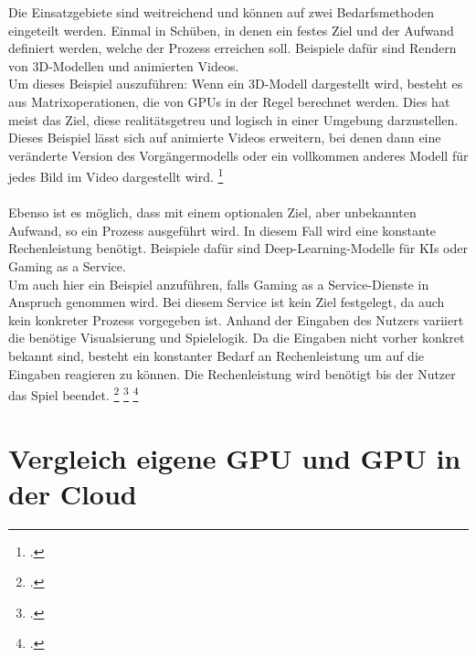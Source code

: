 \documentclass[12pt,toc=bib,toc=listof]{scrreprt}
\begin{document}
Die Einsatzgebiete sind weitreichend und können auf zwei Bedarfsmethoden eingeteilt werden.
Einmal in Schüben, in denen ein festes Ziel und der Aufwand definiert werden, welche der Prozess erreichen soll.
Beispiele dafür sind Rendern von 3D-Modellen und animierten Videos.
\\ 
Um dieses Beispiel auszuführen: Wenn ein 3D-Modell dargestellt wird, besteht es aus Matrixoperationen, die von GPUs 
in der Regel berechnet werden. Dies hat meist das Ziel, diese realitätsgetreu und logisch in einer Umgebung darzustellen.
Dieses Beispiel lässt sich auf animierte Videos erweitern, bei denen dann eine veränderte Version des Vorgängermodells oder ein 
vollkommen anderes Modell für jedes Bild im Video dargestellt wird. \footcite [Vgl.] [] {Loop.2006}
\\ \\
Ebenso ist es möglich, dass mit einem optionalen Ziel, aber unbekannten Aufwand, so ein Prozess ausgeführt wird. 
In diesem Fall wird eine konstante Rechenleistung benötigt.
Beispiele dafür sind Deep-Learning-Modelle für KIs oder Gaming as a Service.
\\
Um auch hier ein Beispiel anzuführen, falls Gaming as a Service-Dienste in Anspruch genommen wird.
Bei diesem Service ist kein Ziel festgelegt, da auch kein konkreter Prozess vorgegeben ist.
Anhand der Eingaben des Nutzers variiert die benötige Visualsierung und Spielelogik. Da die Eingaben 
nicht vorher konkret bekannt sind, besteht ein konstanter Bedarf an Rechenleistung um auf die Eingaben 
reagieren zu können. Die Rechenleistung wird benötigt bis der Nutzer das Spiel beendet. \footcite [Vgl.] [] {Lattuada.2022} \footcite [Vgl.] [] {Wang.2017} \footcite [Vgl.] [] {Loop.2006}

\section{Vergleich eigene GPU und GPU in der Cloud}
\label{sec:Vergleich eigene GPU und GPU in der Cloud}
\end{document}
